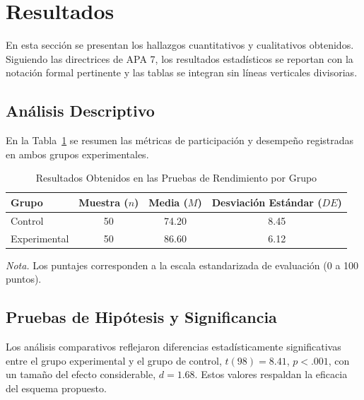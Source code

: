 \section{Resultados}

En esta sección se presentan los hallazgos cuantitativos y cualitativos obtenidos. Siguiendo las directrices de APA 7, los resultados estadísticos se reportan con la notación formal pertinente y las tablas se integran sin líneas verticales divisorias.

\subsection{Análisis Descriptivo}
En la Tabla~\ref{tab:rendimiento} se resumen las métricas de participación y desempeño registradas en ambos grupos experimentales.

\begin{table}[h]
    \caption{Resultados Obtenidos en las Pruebas de Rendimiento por Grupo}
    \label{tab:rendimiento}
    \centering
    \begin{tabular}{lccc}
        \toprule
        Grupo & Muestra ($n$) & Media ($M$) & Desviación Estándar ($DE$) \\
        \midrule
        Control & 50 & 74.20 & 8.45 \\
        Experimental & 50 & 86.60 & 6.12 \\
        \bottomrule
    \end{tabular}
    \begin{tablenotes}
        \small
        \item \textit{Nota.} Los puntajes corresponden a la escala estandarizada de evaluación (0 a 100 puntos).
    \end{tablenotes}
\end{table}

\subsection{Pruebas de Hipótesis y Significancia}
Los análisis comparativos reflejaron diferencias estadísticamente significativas entre el grupo experimental y el grupo de control, $t(98) = 8.41$, $p < .001$, con un tamaño del efecto considerable, $d = 1.68$. Estos valores respaldan la eficacia del esquema propuesto.
